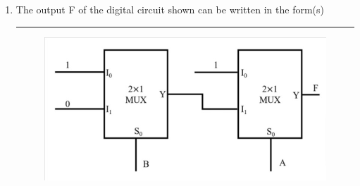 \documentclass{article}
\begin{document}
\begin{enumerate}
\item The output F of the digital circuit shown can be written in the form(s)\rule{2cm}{0.5pt}
\begin{figure}[h]
\centering
\includegraphics[width=\columnwidth]{gate.jpg}
\caption{}
\label{fig:my_label}
\end{figure}
\end{enumerate}
\end{document}
